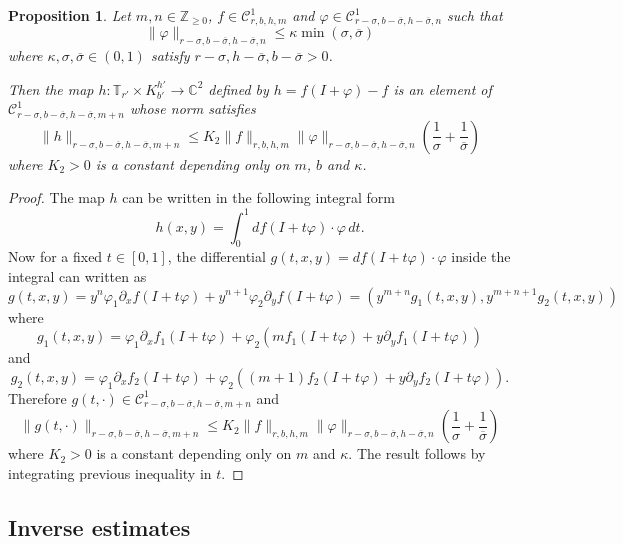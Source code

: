 \documentclass[10pt]{article}
\newtheorem{proposition}[theorem]{Proposition}
\newcommand{\Z}{\mathbb{Z}}
\newcommand{\C}{\mathbb{C}}
\newcommand{\T}{\mathbb{T}}
\begin{document}
\begin{proposition}
\label{proposition:difference_estimates}
Let $m,n\in\Z_{\geq0}$, $f\in\mathscr C^1_{r,b,h,m}$ and $\varphi\in\mathscr C^1_{r-\sigma,b-\overline\sigma,h-\overline\sigma,n}$ such that 
\begin{equation}
\label{eq:size_compo_2}
\|\varphi\|_{r-\sigma,b-\overline\sigma,h-\overline\sigma,n} \leq \kappa\min(\sigma,\overline\sigma)
\end{equation}
where $\kappa,\sigma,\overline\sigma\in(0,1)$ satisfy $r-\sigma,h-\overline\sigma,b-\overline\sigma>0$.  

Then the map $h:\T_{r'}\times K_{b'}^{h'}\to \C^2$ defined by
$h=f(I+\varphi)-f$ is an element of $\mathscr C^1_{r-\sigma,b-\overline\sigma,h-\overline\sigma,m+n}$ whose norm satisfies
$$\|h\|_{r-\sigma,b-\overline\sigma,h-\overline\sigma,m+n}\leq K_2\|f\|_{r,b,h,m}\|\varphi\|_{r-\sigma,b-\overline\sigma,h-\overline\sigma,n}\left(
\frac{1}{\sigma}
+\frac{1}{\overline\sigma}\right)$$
where $K_2>0$ is a constant depending only on $m$, $b$ and $\kappa$.
\end{proposition}

\begin{proof}
The map $h$ can be written in the following integral form
 $$h(x,y) = \int_0^1 df(I+t\varphi)\cdot\varphi\, dt.$$
 Now for a fixed $t\in[0,1]$, the differential $g(t,x,y)=df(I+t\varphi)\cdot\varphi$ inside the integral can written as
 \[
g(t,x,y) = 
y^n\varphi_1\partial_xf(I+t\varphi)+y^{n+1}\varphi_2\partial_yf(I+t\varphi) 
= (y^{m+n}g_1(t,x,y),y^{m+n+1}g_2(t,x,y))
\]
where
\[
g_1(t,x,y) = \varphi_1\partial_xf_1(I+t\varphi)+\varphi_2(mf_1(I+t\varphi)+y\partial_yf_1(I+t\varphi))
\]
and
\[
g_2(t,x,y) = \varphi_1\partial_xf_2(I+t\varphi)+\varphi_2((m+1)f_2(I+t\varphi)+y\partial_yf_2(I+t\varphi)).
\]
Therefore $g(t,\cdot)\in \mathscr C^1_{r-\sigma,b-\overline\sigma,h-\overline\sigma,m+n}$ and 
\[
\|g(t,\cdot)\|_{r-\sigma,b-\overline\sigma,h-\overline\sigma,m+n}\leq K_2\|f\|_{r,b,h,m}\|\varphi\|_{r-\sigma,b-\overline\sigma,h-\overline\sigma,n}\left(
\frac{1}{\sigma}
+\frac{1}{\overline\sigma}\right)
\]
where $K_2>0$ is a constant depending only on $m$ and $\kappa$. The result follows by integrating previous inequality in $t$.
\end{proof}

\subsection{Inverse estimates}
\end{document}

